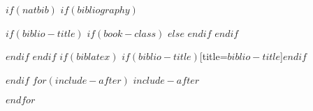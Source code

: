 \documentclass[$if(fontsize)$$fontsize$,$endif$$if(lang)$$babel-lang$,$endif$$if(papersize)$$papersize$paper,$endif$$for(classoption)$$classoption$$sep$,$endfor$]{$documentclass$}
\begin{document}
%	




\newpage

\begingroup
\begin{singlespace}
$if(natbib)$
$if(bibliography)$
$if(biblio-title)$
$if(book-class)$
\renewcommand\bibname{$biblio-title$}
$else$
\renewcommand\refname{$biblio-title$}
$endif$
$endif$


$endif$
$endif$
$if(biblatex)$
\printbibliography$if(biblio-title)$[title=$biblio-title$]$endif$

$endif$
$for(include-after)$
$include-after$

$endfor$

\end{singlespace}
\endgroup
\end{document}
